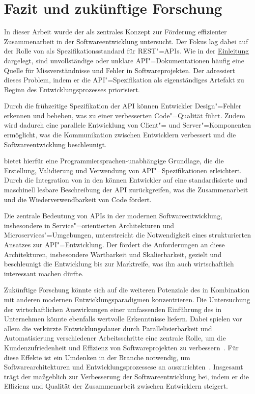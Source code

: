 \chapter{Fazit und zukünftige Forschung}
In dieser Arbeit wurde der \AFA als zentrales Konzept zur Förderung effizienter Zusammenarbeit in der Softwareentwicklung untersucht.
Der Fokus lag dabei auf der Rolle von \OA als Spezifikationsstandard für \ac{REST}"=\acp{API}.
Wie in der \hyperref[ch:introduction]{Einleitung} dargelegt, sind unvollständige oder unklare \ac{API}"=Dokumentationen häufig eine Quelle für Missverständnisse und Fehler in Softwareprojekten.
Der \AFA adressiert dieses Problem, indem er die \ac{API}"=Spezifikation als eigenständiges Artefakt zu Beginn des Entwicklungsprozesses priorisiert.

Durch die frühzeitige Spezifikation der \ac{API} können Entwickler Design"=Fehler erkennen und beheben, was zu einer verbesserten Code"=Qualität führt.
Zudem wird dadurch eine parallele Entwicklung von Client"= und Server"=Komponenten ermöglicht, was die Kommunikation zwischen Entwicklern verbessert und die Softwareentwicklung beschleunigt.

\OA bietet hierfür eine Programmiersprachen-unabhängige Grundlage, die die Erstellung, Validierung und Verwendung von \ac{API}"=Spezifikationen erleichtert.
Durch die Integration von \OA in den \AFA können Entwickler auf eine standardisierte und maschinell lesbare Beschreibung der \ac{API} zurückgreifen, was die Zusammenarbeit und die Wiederverwendbarkeit von Code fördert.

Die zentrale Bedeutung von \acp{API} in der modernen Softwareentwicklung, insbesondere in Service"=orientierten Architekturen und Microservices"=Umgebungen, unterstreicht die Notwendigkeit eines strukturierten Ansatzes zur \ac{API}"=Entwicklung.
Der \AFA fördert die Anforderungen an diese Architekturen, insbesondere Wartbarkeit und Skalierbarkeit, gezielt und beschleunigt die Entwicklung bis zur Marktreife, was ihn auch wirtschaftlich interessant machen dürfte.

Zukünftige Forschung könnte sich auf die weiteren Potenziale des \AFAes in Kombination mit anderen modernen Entwicklungsparadigmen konzentrieren.
Die Untersuchung der wirtschaftlichen Auswirkungen einer umfassenden Einführung des \AFAes in Unternehmen könnte ebenfalls wertvolle Erkenntnisse liefern.
Dabei spielen vor allem die verkürzte Entwicklungsdauer durch Parallelisierbarkeit und Automatisierung verschiedener Arbeitsschritte eine zentrale Rolle, um die Kundenzufriedenheit und Effizienz von Softwareprojekten zu verbessern~\cites[77]{bea22}[355,360]{de23}.
Für diese Effekte ist ein Umdenken in der Branche notwendig, um Softwarearchitekturen und Entwicklungsprozessese an \AF auszurichten~\cites[2]{kul23}[361]{de23}.
Insgesamt trägt der \AFA maßgeblich zur Verbesserung der Softwareentwicklung bei, indem er die Effizienz und Qualität der Zusammenarbeit zwischen Entwicklern steigert.